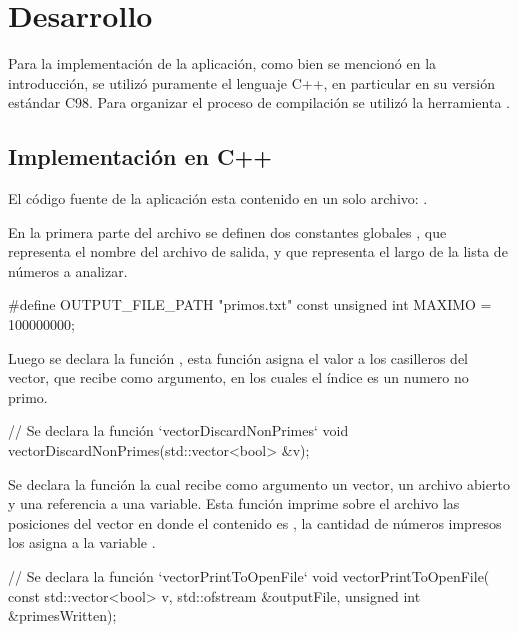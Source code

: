 \documentclass[12pt]{article}
\newenvironment{fullgrayverb}
{\verbbox}
{\endverbbox\par\colorbox{gray!25}{\parbox{\textwidth}{\theverbbox}}\par}
\begin{document}
\section{Desarrollo}

Para la implementación de la aplicación, como bien se mencionó en la
introducción, se utilizó puramente el lenguaje C++, en particular en su versión
estándar C98. Para organizar el proceso de compilación se utilizó la herramienta
.

\subsection{Implementación en C++}

El código fuente de la aplicación esta contenido en un solo archivo:
.

En la primera parte del archivo se definen dos constantes globales
, que representa el nombre del archivo de salida, y
 que representa el largo de la lista de números a analizar.

\begin{fullgrayverb}[\mbox{}]
#define OUTPUT_FILE_PATH "primos.txt"
const unsigned int MAXIMO = 100000000;
\end{fullgrayverb}

Luego se declara la función , esta función asigna
el valor  a los casilleros del vector, que recibe como argumento, en
los cuales el índice es un numero no primo.

\begin{fullgrayverb}[\mbox{}]
// Se declara la función `vectorDiscardNonPrimes`
void vectorDiscardNonPrimes(std::vector<bool> &v);
\end{fullgrayverb}

Se declara la función  la cual recibe como
argumento un vector, un archivo abierto y una referencia a una variable. Esta
función imprime sobre el archivo las posiciones del vector en donde el
contenido es , la cantidad de números impresos los asigna a la
variable .

\begin{fullgrayverb}[\mbox{}]
// Se declara la función `vectorPrintToOpenFile`
void vectorPrintToOpenFile(
         const std::vector<bool> v,
         std::ofstream &outputFile,
         unsigned int &primesWritten);
\end{fullgrayverb}
\end{document}

